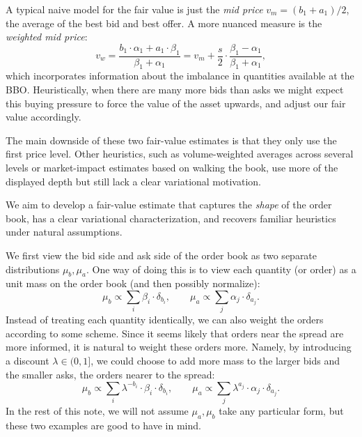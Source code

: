 A typical naive model for the fair value is just the \textit{mid price}
$v_{m} = (b_1 + a_1) / 2$, the average of the best bid and best offer.
 A more nuanced measure is the \textit{weighted mid price}:
%
\[v_w = \frac{b_1 \cdot \alpha_1 + a_1 \cdot \beta_1}{\beta_1 + \alpha_1} = v_m + \frac{s}{2} \cdot \frac{\beta_1 - \alpha_1}{\beta_1 + \alpha_1},\]
%
which incorporates information about the imbalance in quantities available at the
 BBO. Heuristically, when there are many more bids than asks we might expect this
 buying pressure to force the value of the asset upwards, and adjust our
 fair value accordingly.

The main downside of these two fair-value estimates is that they only use the
first price level. Other heuristics, such as volume-weighted averages across
several levels or market-impact estimates based on walking the book, use more of
the displayed depth but still lack a clear variational motivation.

We aim to develop a fair-value estimate that captures the \textit{shape} of the
order book, has a clear variational characterization, and recovers familiar
heuristics under natural assumptions.

We first view the bid side and ask side of the order book as two separate
distributions $\mu_b, \mu_a$. One way of doing
this is to view each quantity (or order) as a unit mass on the order book
(and then possibly normalize):
%
\begin{equation}
    \mu_b \propto \sum_{i} \beta_i \cdot \delta_{b_i}, \qquad \mu_a \propto \sum_{j} \alpha_j \cdot \delta_{a_j}.
    \label{eqn:mua_mub_proportional}
\end{equation}
%
\noindent Instead of treating each quantity identically, we can also weight
 the orders according to some scheme. Since it seems likely that orders near the spread
 are more informed, it is natural to weight these orders more. Namely, by introducing a
 discount $\lambda \in (0,1]$, we could choose to add more mass to the larger bids and
 the smaller asks, the orders nearer to the spread:
%
\begin{equation}
    \mu_b \propto \sum_{i} \lambda^{-b_i} \cdot \beta_i \cdot \delta_{b_i}, \qquad \mu_a \propto \sum_{j} \lambda^{a_j} \cdot \alpha_j \cdot \delta_{a_j}.
    \label{eqn:mua_mub}
\end{equation}
%
In the rest of this note, we will not assume $\mu_a, \mu_b$ take any
 particular form, but these two examples are good to have in mind.

